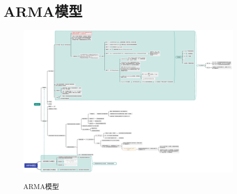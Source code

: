 \section{ARMA模型}
\begin{figure}[!htb]
    \includegraphics[scale=0.2]{Chapter/TikZ/ARMA模型.pdf}
    \label{ARMA模型}
    \caption{ARMA模型}
\end{figure}